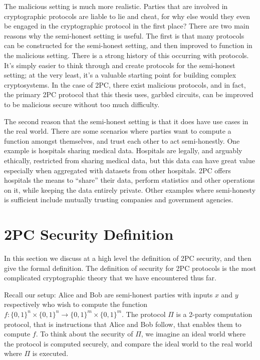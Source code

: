 The malicious setting is much more realistic. 
Parties that are involved in cryptographic protocols are liable to lie and cheat, for why else would they even be engaged in the cryptographic protocol in the first place?
There are two main reasons why the semi-honest setting is useful.
The first is that many protocols can be constructed for the semi-honest setting, and then improved to function in the malicious setting.
There is a strong history of this occurring with protocols.
It's simply easier to think through and create protocols for the semi-honest setting; at the very least, it's a valuable starting point for building complex cryptosystems.
In the case of 2PC, there exist malicious protocols, and in fact, the primary 2PC protocol that this thesis uses, garbled circuits, can be improved to be malicious secure without too much difficulty. 

The second reason that the semi-honest setting is that it does have use cases in the real world.
There are some scenarios where parties want to compute a function amongst themselves, and trust each other to act semi-honestly.
One example is hospitals sharing medical data.
Hospitals are legally, and arguably ethically, restricted from sharing medical data, but this data can have great value especially when aggregated with datasets from other hospitals.
2PC offers hospitals the means to ``share'' their data, perform statistics and other operations on it, while keeping the data entirely private. 
Other examples where semi-honesty is sufficient include mutually trusting companies and government agencies.

\section{2PC Security Definition}
In this section we discuss at a high level the definition of 2PC security, and then give the formal definition. 
The definition of security for 2PC protocols is the most complicated cryptographic theory that we have encountered thus far. 

Recall our setup: Alice and Bob are semi-honest parties with inputs $x$ and $y$ respectively who wish to compute the function $f: \{0,1\}^n \times \{0,1\}^n \to \{0,1\}^m \times \{0,1\}^m$.
The protocol $\Pi$ is a 2-party computation protocol, that is instructions that Alice and Bob follow, that enables them to compute $f$.
To think about the security of $\Pi$, we imagine an ideal world where the protocol is computed securely, and compare the ideal world to the real world where $\Pi$ is executed.

